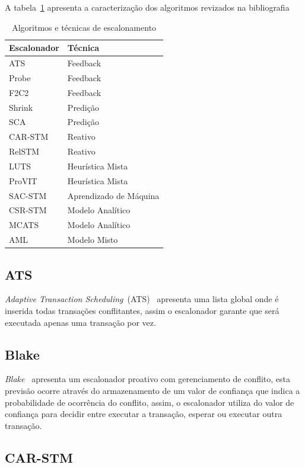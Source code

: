 \documentclass[diss,capa]{texufpel}
\begin{document}
A tabela~\ref{tab:compare} apresenta a caracterização dos algoritmos revizados na bibliografia

\begin{table}[]
\footnotesize
\centering
\caption{Algoritmos e técnicas de escalonamento}
\label{tab:compare}
\begin{tabular}{l|l}
\hline
Escalonador & Técnica \\ \hline
ATS & Feedback \\
Probe & Feedback \\
F2C2 & Feedback \\
Shrink & Predição \\
SCA & Predição \\
CAR-STM & Reativo \\
RelSTM & Reativo \\
LUTS & Heurística Mista \\
ProVIT & Heurística Mista \\
SAC-STM & Aprendizado de Máquina \\
CSR-STM & Modelo Analítico \\
MCATS & Modelo Analítico \\
AML & Modelo Misto \\
\hline
\end{tabular}
\end{table}

\subsection{ATS}

\emph{Adaptive Transaction Scheduling}~(ATS)~\cite{ats2008} apresenta uma lista global onde é inserida todas transações conflitantes, assim o escalonador garante que será executada apenas uma transação por vez.

\subsection{Blake}

\emph{Blake}~\cite{blake2009} apresenta um escalonador proativo com gerenciamento de conflito, esta previsão ocorre através do armazenamento de um valor de confiança que indica a probabilidade de ocorrência do conflito, assim, o escalonador utiliza do valor de confiança para decidir entre executar a transação, esperar ou executar outra transação.

\subsection{CAR-STM}
\end{document}
